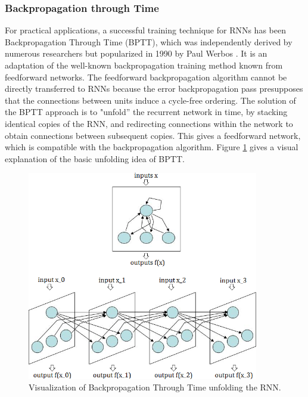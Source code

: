 \documentclass[12pt,oneside]{CUNY_CS_PhD}
\begin{document}
\subsubsection{Backpropagation through Time}
For practical applications, a successful training technique for RNNs has been Backpropagation Through Time (BPTT), which was independently derived by numerous researchers but popularized in 1990 by Paul Werbos \cite{werbos_backpropagation_1990}. It is an adaptation of the well-known backpropagation training method known from feedforward networks. The feedforward backpropagation algorithm cannot be directly transferred to RNNs because the error backpropagation pass presupposes that the connections between units induce a cycle-free ordering. The solution of the BPTT approach is to "unfold'' the recurrent network in time, by stacking identical copies of the RNN, and redirecting connections within the network to obtain connections between subsequent copies. This gives a feedforward network, which is compatible with the backpropagation algorithm. Figure \ref{fig:bptt} gives a visual explanation of the basic unfolding idea of BPTT.

\begin{figure}[!htbp]
\centering
\includegraphics[width=0.9\textwidth]{pictures/bptt-influence2.png}
\caption{Visualization of Backpropagation Through Time unfolding the RNN.}
\label{fig:bptt}
\end{figure}
\end{document}
